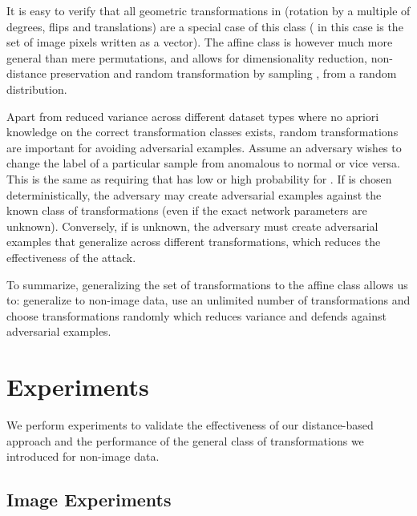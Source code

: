 \documentclass{article} \usepackage{iclr2020_conference,times}
\begin{document}
It is easy to verify that all geometric transformations in \cite{golan2018deep} (rotation by a multiple of  degrees, flips and translations) are a special case of this class ( in this case is the set of image pixels written as a vector). The affine class is however much more general than mere permutations, and allows for dimensionality reduction, non-distance preservation and random transformation by sampling ,  from a random distribution.

Apart from reduced variance across different dataset types where no apriori knowledge on the correct transformation classes exists, random transformations are important for avoiding adversarial examples. Assume an adversary wishes to change the label of a particular sample from anomalous to normal or vice versa. This is the same as requiring that  has low or high probability for . If  is chosen deterministically, the adversary may create adversarial examples against the known class of transformations (even if the exact network parameters are unknown). Conversely, if  is unknown, the adversary must create adversarial examples that generalize across different transformations, which reduces the effectiveness of the attack.

To summarize, generalizing the set of transformations to the affine class allows us to: generalize to non-image data, use an unlimited number of transformations and choose transformations randomly which reduces variance and defends against adversarial examples.

\section{Experiments}
\label{sec:exp}

We perform experiments to validate the effectiveness of our distance-based approach and the performance of the general class of transformations we introduced for non-image data. 

\subsection{Image Experiments}
\label{subsec:cifar10}
\end{document}
